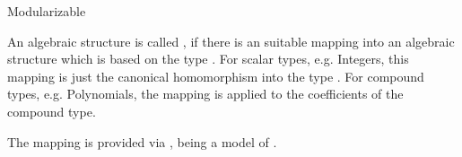 \begin{ccRefConcept}{Modularizable}

\ccDefinition

An algebraic structure is called \ccRefName, if there is an suitable mapping 
into an algebraic structure which is based on the type . 
For scalar types, e.g. Integers, this mapping is just the canonical homomorphism 
into the type . For compound types, e.g. Polynomials, 
the mapping is applied to the coefficients of the compound type. 

The mapping is provided via , 
being a model of .

\ccSeeAlso
{}\\
\\

\end{ccRefConcept}